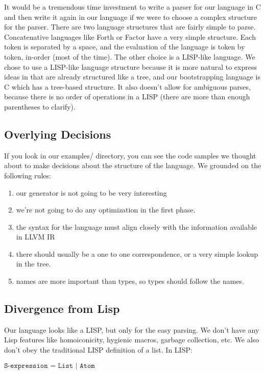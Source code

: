 \documentclass[journal=jacsat, manuscript=article]{achemso}
\begin{document}
It would be a tremendous time investment to write a parser for our language in C and then write
it again in our language if we were to choose a complex structure for the parser. There are two
language structures that are fairly simple to parse. Concatenative languages like Forth or Factor
have a very simple structure. Each token is separated by a space, and the evaluation of the
language is token by token, in-order (most of the time). The other choice is a LISP-like language.
We chose to use a LISP-like language structure because it is more natural to express ideas in that
are already structured like a tree, and our bootstrapping language is C which has a tree-based
structure. It also doesn't allow for ambiguous parses, because there is no order of operations
in a LISP (there are more than enough parentheses to clarify).

\subsection{Overlying Decisions}

If you look in our examples/ directory, you can see the code samples we thought about to make
decisions about the structure of the language. We grounded on the following rules:
\begin{enumerate}
\item our generator is not going to be very interesting
\item we're not going to do any optimization in the first phase.
\item the syntax for the language must align closely with the information available in LLVM IR
\item there should usually be a one to one correspondence, or a very simple lookup in the tree.
\item names are more important than types, so types should follow the names.
\end{enumerate}

\subsection{Divergence from Lisp}

Our language looks like a LISP, but only for the easy parsing. We don't have any Lisp features
like homoiconicity, hygienic macros, garbage collection, etc. We also don't obey the traditional
LISP definition of a list. In LISP:

$\texttt{S-expression = List | Atom}$
\end{document}

